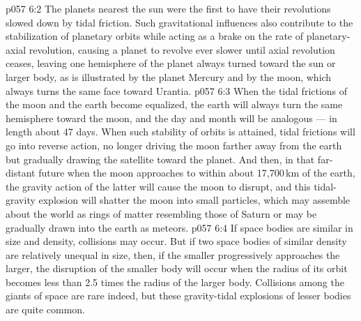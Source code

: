 \vs p057 6:2 \pc The planets nearest the sun were the first to have their revolutions slowed down by tidal friction. Such gravitational influences also contribute to the stabilization of planetary orbits while acting as a brake on the rate of planetary\hyp{}axial revolution, causing a planet to revolve ever slower until axial revolution ceases, leaving one hemisphere of the planet always turned toward the sun or larger body, as is illustrated by the planet Mercury and by the moon, which always turns the same face toward Urantia.
\vs p057 6:3 When the tidal frictions of the moon and the earth become equalized, the earth will always turn the same hemisphere toward the moon, and the day and month will be analogous --- in length about 47 days. When such stability of orbits is attained, tidal frictions will go into reverse action, no longer driving the moon farther away from the earth but gradually drawing the satellite toward the planet. And then, in that far\hyp{}distant future when the moon approaches to within about 17,700\,km of the earth, the gravity action of the latter will cause the moon to disrupt, and this tidal\hyp{}gravity explosion will shatter the moon into small particles, which may assemble about the world as rings of matter resembling those of Saturn or may be gradually drawn into the earth as meteors.
\vs p057 6:4 If space bodies are similar in size and density, collisions may occur. But if two space bodies of similar density are relatively unequal in size, then, if the smaller progressively approaches the larger, the disruption of the smaller body will occur when the radius of its orbit becomes less than 2.5 times the radius of the larger body. Collisions among the giants of space are rare indeed, but these gravity\hyp{}tidal explosions of lesser bodies are quite common.
